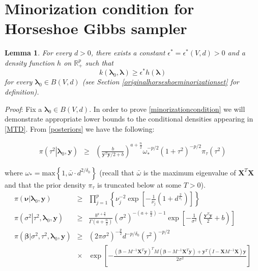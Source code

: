 \documentclass[noinfoline,11pt]{imsart}
\numberwithin{equation}{section}
\theoremstyle{plain}
\newtheorem{lem}{Lemma}[section]
\newcommand{\y}{\mathbf{y}}
\newcommand{\X}{\mathbf{X}}
\newcommand{\bl}{\boldsymbol{\lambda}}
\begin{document}
\section{Minorization condition for Horseshoe Gibbs sampler} \label{Appendix C}

\begin{lem}\label{Theorem2}
For every $d > 0$, there exists a constant $\epsilon^*=\epsilon^*\left(V,d\right)>0$ and a density function $h$ on $\mathbb{R}_+^p$ such that
\begin{equation}\label{minorizationcondition}
   k\left(\bl_0,\bl\right)\geq \epsilon^* h\left(\bl\right) 
\end{equation}
for every $\bl_0\in B\left(V,d\right)$ (see Section \ref{originalhorseshoeminorizationset} for definition).
\end{lem}

\noindent
{\it Proof}: Fix a $\bl_0\in B\left(V,d\right)$. In order to prove \eqref{minorizationcondition} we will demonstrate appropriate lower bounds to the conditional densities appearing in \eqref{MTD}. From \eqref{posteriors} we have the following:

\begin{eqnarray*}
  \pi\left(\left.\tau^2\right|\bl_0,\y\right) &\geq&  \left(\frac{b}{\y^T\y/2+b}\right)^{a+\frac{n}{2}}\omega_*^{-p/2} \left(1+\tau^2\right)^{-p/2}\pi_\tau\left(\tau^2\right)
\end{eqnarray*}

\noindent

where $\omega_*=\text{max}\left\{1,\bar \omega\cdot d^{2/\delta_0}\right\}$ (recall that $\bar \omega$ is the maximum eigenvalue of $\X^T\X$ and that the prior density $\pi_\tau$ is truncated below at some $T>0$).
\begin{eqnarray*}
  \pi\left(\left.\boldsymbol{\nu}\right|\bl_0,\y\right) &\geq&  \prod_{j=1}^p\left\{\nu_j^{-2}\exp{\left[-\frac{1}{\nu_j}\left(1+d^{\frac{2}{\delta_1}}\right)\right]}\right\}\nonumber \\
  \pi\left(\left.\sigma^2\right|\tau^2,\bl_0,\y\right) &\geq& \frac{b^{a+\frac{n}{2}}}{\Gamma\left(a+\frac{n}{2}\right)}\left(\sigma^2\right)^{-\left(a+\frac{n}{2}\right)-1}\exp{\left[-\frac{1}{\sigma^2}\left(\frac{\y^T\y}{2}+b\right)\right]}\nonumber \\
  \pi\left(\left.\boldsymbol{\beta}\right|\sigma^2,\tau^2,\bl_0,\y\right) &\geq& \left(2\pi\sigma^2\right)^{-\frac{p}{2}}d^{-p/\delta_0}\left(\tau^2\right)^{-p/2}\nonumber \\
\qquad \qquad &\times&  \exp{\left[-\frac{\left(\boldsymbol{\beta}-M^{-1}\X^T\y\right)^T M\left(\boldsymbol{\beta}-M^{-1}\X^T\y\right)+\y^T\left(I-\X M^{-1}\X\right)\y}{2\sigma^2}\right]}\nonumber \\
\end{eqnarray*}
\end{document}
